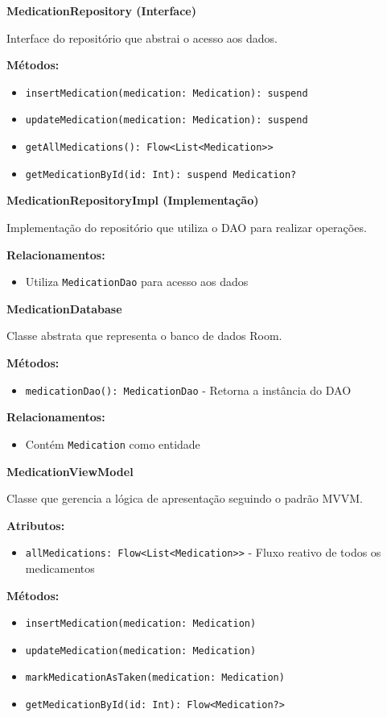 \documentclass[12pt]{article}
\begin{document}
\textbf{MedicationRepository (Interface)}

Interface do repositório que abstrai o acesso aos dados.

\textbf{Métodos:}
\begin{itemize}
    \item \texttt{insertMedication(medication: Medication): suspend}
    \item \texttt{updateMedication(medication: Medication): suspend}
    \item \texttt{getAllMedications(): Flow<List<Medication>>}
    \item \texttt{getMedicationById(id: Int): suspend Medication?}
\end{itemize}

\textbf{MedicationRepositoryImpl (Implementação)}

Implementação do repositório que utiliza o DAO para realizar operações.

\textbf{Relacionamentos:}
\begin{itemize}
    \item Utiliza \texttt{MedicationDao} para acesso aos dados
\end{itemize}

\textbf{MedicationDatabase}

Classe abstrata que representa o banco de dados Room.

\textbf{Métodos:}
\begin{itemize}
    \item \texttt{medicationDao(): MedicationDao} - Retorna a instância do DAO
\end{itemize}

\textbf{Relacionamentos:}
\begin{itemize}
    \item Contém \texttt{Medication} como entidade
\end{itemize}

\textbf{MedicationViewModel}

Classe que gerencia a lógica de apresentação seguindo o padrão MVVM.

\textbf{Atributos:}
\begin{itemize}
    \item \texttt{allMedications: Flow<List<Medication>>} - Fluxo reativo de todos os medicamentos
\end{itemize}

\textbf{Métodos:}
\begin{itemize}
    \item \texttt{insertMedication(medication: Medication)}
    \item \texttt{updateMedication(medication: Medication)}
    \item \texttt{markMedicationAsTaken(medication: Medication)}
    \item \texttt{getMedicationById(id: Int): Flow<Medication?>}
\end{itemize}
\end{document}
